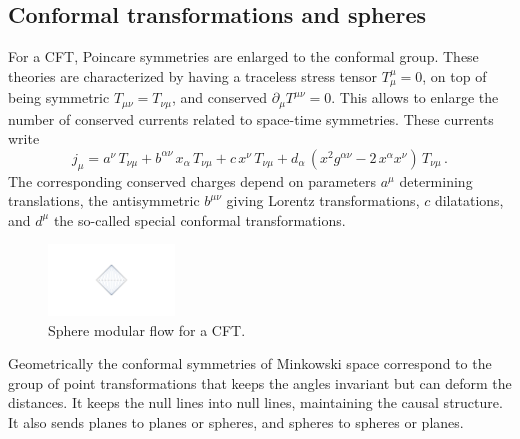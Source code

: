 \documentclass[11pt]{article}
\numberwithin{equation}{section}
\newcommand{\be}{\begin{equation}}
\newcommand{\ee}{\end{equation}}
\begin{document}
\subsection{Conformal transformations and spheres}
For a CFT, Poincare symmetries are enlarged to the conformal group. These theories are characterized by having a traceless stress tensor $T_\mu^\mu=0$, on top of being symmetric $T_{\mu\nu}=T_{\nu\mu}$, and conserved  $\partial_\mu T^{\mu\nu}=0$. This allows to enlarge the number of conserved currents related to space-time symmetries. These currents write
\be  
j_\mu= a^\nu \,T_{\nu\mu} +  b^{\alpha \nu}\,x_\alpha\, T_{\nu\mu} + c\, x^\nu\, T_{\nu\mu} + d_\alpha\, (x^2 g^{\alpha\nu}-2\, x^\alpha x^\nu)\, T_{\nu\mu}\,.\label{das} 
\ee
The corresponding conserved charges depend on parameters $a^\mu$ determining translations, the antisymmetric $b^{\mu\nu}$ giving Lorentz transformations, $c$ dilatations, and $d^\mu$ the so-called special conformal transformations.   

\begin{figure}[t]
\begin{center}  
\includegraphics[width=0.30\textwidth]{flowsphere.pdf}
\captionsetup{width=0.9\textwidth}
\caption{Sphere modular flow for a CFT.}
\label{smf}
\end{center}  
\end{figure}

Geometrically the conformal symmetries of Minkowski space correspond to the group of point transformations that keeps the angles invariant but can deform the distances. It keeps the null lines into null lines, maintaining the causal structure. It also sends planes to planes or spheres, and spheres to spheres or planes.  
\end{document}
